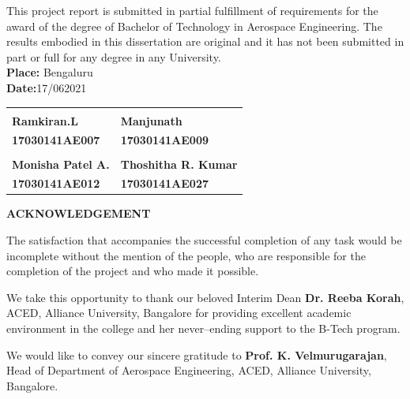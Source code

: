 \documentclass[12pt]{article}
\begin{document}
This project report is submitted in partial fulfillment of requirements for the award of the degree of Bachelor of Technology in Aerospace Engineering. The results embodied in this dissertation are original and it has not been submitted in part or full for any degree in any University. \vspace{4em}\\
\textbf{Place:} Bengaluru\\
\textbf{Date:}17/062021 \vspace{5em}\\

\begin{center}
\begin{tabular}{K{7.5cm} K{7.5cm}}
\underline{\hspace{2.5cm}} & \underline{\hspace{2.5cm}} \\ 
\textbf{Ramkiran.L} & \textbf{Manjunath} \\ 
\textbf{17030141AE007} & \textbf{17030141AE009} \vspace{3em}\\ 
\underline{\hspace{3cm}} & \underline{\hspace{4cm}} \\ 
\textbf{Monisha Patel A.} & \textbf{Thoshitha R. Kumar} \\ 
\textbf{17030141AE012} & \textbf{17030141AE027}
\end{tabular} 
\end{center}
\thispagestyle{empty}
\newpage
\begin{center}
\Large \textbf{ACKNOWLEDGEMENT}
\end{center}
\normalsize
\hspace{4em}The satisfaction that accompanies the successful completion of any task would be incomplete without the mention of the people, who are responsible for the completion of the project and who made it possible.\par

We take this opportunity to thank our beloved Interim Dean \textbf{Dr. Reeba Korah}, ACED, Alliance University, Bangalore for providing excellent academic environment in the college and her never--ending support to the B-Tech program.\par

We would like to convey our sincere gratitude to \textbf{Prof. K. Velmurugarajan}, Head of Department of Aerospace Engineering, ACED, Alliance University, Bangalore. \par
\end{document}
